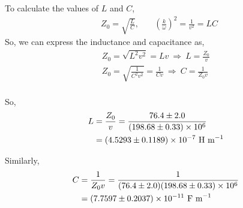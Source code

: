 To calculate the values of $L$ and $C$,
\begin{align}
    & Z_0 = \sqrt{\frac{L}{C}}, \quad & \left(\frac{k}{\omega}\right)^2 = \frac1{v^2} = LC 
\end{align} 
So, we can express the inductance and capacitance as,
\begin{align}
    Z_0 = \sqrt{L^2 v^2} = Lv \ \Rightarrow \ \boxed{L = \frac{Z_0}{v}} \\
    Z_0 = \sqrt{\frac1{C^2 v^2}} = \frac{1}{Cv} \ \Rightarrow \ 
    \boxed{C =\frac1{Z_0 v}} \\
\end{align}

So,
\begin{align}
    L &= \frac{Z_0}{v} = \frac{76.4 \pm 2.0}{(198.68 \pm 0.33) \times10^{6}} \\
    &= (4.5293 \pm 0.1189) \times10^{-7} \ \text{H\ m}^{-1}
\end{align}

Similarly,
\begin{align}
    C &= \frac1{Z_0 v} = \frac1{(76.4 \pm 2.0)(198.68 \pm 0.33) \times10^{6}} \\
    &= (7.7597 \pm 0.2037)\times10^{-11} \ \text{F\ m}^{-1}
\end{align}

